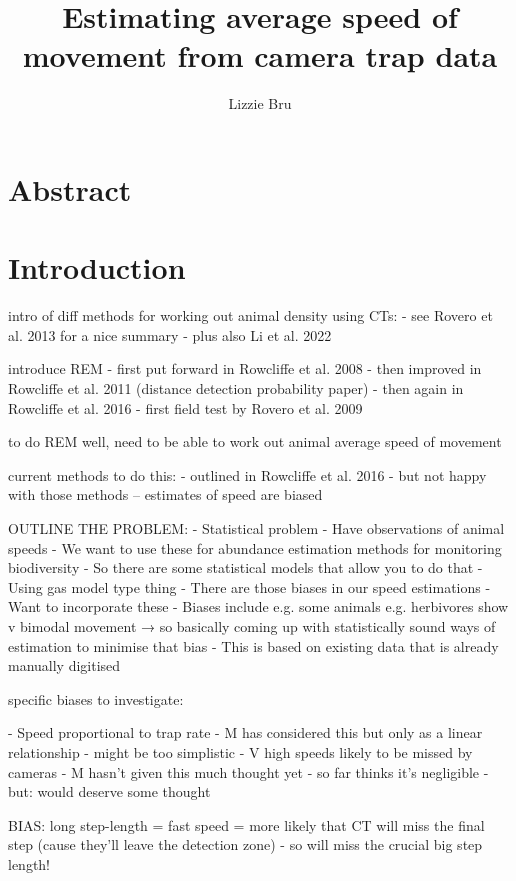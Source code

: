 \documentclass[11pt]{article}
\title{\textbf{Estimating average speed of movement from camera trap data}}
\author[1]{Lizzie Bru}
\affil[1]{School of Life Sciences, Imperial College London, Silwood Park Campus, Ascot SL5 7PY, UK}
\date{}
\begin{document}
	
	\maketitle
	
	\newpage
	
	\section{Abstract}

	
	\section{Introduction}
	
	intro of diff methods for working out animal density using CTs:
	- see Rovero et al. 2013 for a nice summary
	- plus also Li et al. 2022
	
	introduce REM
	- first put forward in Rowcliffe et al. 2008
	- then improved in Rowcliffe et al. 2011 (distance detection probability paper)
	- then again in Rowcliffe et al. 2016
	- first field test by Rovero et al. 2009
	
	to do REM well, need to be able to work out animal average speed of movement
	
	current methods to do this:
	- outlined in Rowcliffe et al. 2016
	- but not happy with those methods -- estimates of speed are biased
	
	
	OUTLINE THE PROBLEM:
	- Statistical problem
	- Have observations of animal speeds
	- We want to use these for abundance estimation methods for monitoring biodiversity
	- So there are some statistical models that allow you to do that
	- Using gas model type thing
	- There are those biases in our speed estimations
	- Want to incorporate these
	- Biases include e.g. some animals e.g. herbivores show v bimodal movement
			→ so basically coming up with statistically sound ways of estimation to minimise that bias
	- This is based on existing data that is already manually digitised
	
	
	specific biases to investigate:
	
	- Speed proportional to trap rate
		- M has considered this but only as a linear relationship - might be too simplistic
	- V high speeds likely to be missed by cameras
		- M hasn’t given this much thought yet - so far thinks it’s negligible - but: would deserve some thought


	BIAS: long step-length = fast speed = more likely that CT will miss the final step (cause they’ll leave the detection zone) - so will miss the crucial big step length!
	
\end{document}
